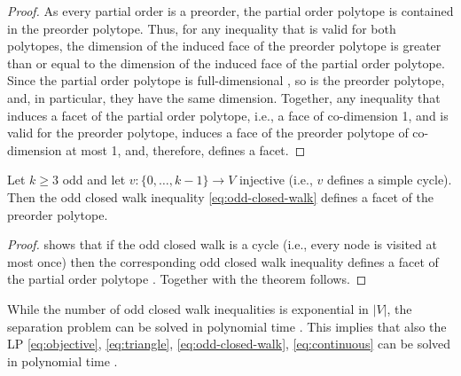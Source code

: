 \begin{proof}
    As every partial order is a preorder, the partial order polytope is contained in the preorder polytope.
    Thus, for any inequality that is valid for both polytopes, the dimension of the induced face of the preorder polytope is greater than or equal to the dimension of the induced face of the partial order polytope.
    Since the partial order polytope is full-dimensional \citep[Theorem 3.1]{muller1996partial}, so is the preorder polytope, and, in particular, they have the same dimension.
    Together, any inequality that induces a facet of the partial order polytope, i.e., a face of co-dimension 1, and is valid for the preorder polytope, induces a face of the preorder polytope of co-dimension at most 1, and, therefore, defines a facet.
\end{proof}

\begin{theorem}
    Let $k \geq 3$ odd and let $v\colon \{0,\dots,k-1\} \to V$ injective (i.e., $v$ defines a simple cycle).
    Then the odd closed walk inequality \eqref{eq:odd-closed-walk} defines a facet of the preorder polytope.
\end{theorem}

\begin{proof}
    \citet{muller1996partial} shows that if the odd closed walk is a cycle (i.e., every node is visited at most once) then the corresponding odd closed walk inequality defines a facet of the partial order polytope \citep[Theorem 4.2]{muller1996partial}.
    Together with  the theorem follows.
\end{proof}

While the number of odd closed walk inequalities is exponential in $|V|$, the separation problem can be solved in polynomial time \citep{muller1996partial}.
This implies that also the LP \eqref{eq:objective}, \eqref{eq:triangle}, \eqref{eq:odd-closed-walk}, \eqref{eq:continuous} can be solved in polynomial time \citep{grotschel1981ellipsoid}.
